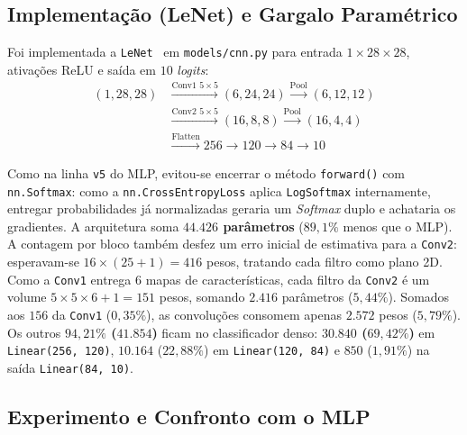 \documentclass[
	12pt,
	a4paper,
	article,
	twocolumn
]{abntex2}
\begin{document}
\subsection{Implementação (LeNet) e Gargalo Paramétrico}

Foi implementada a \texttt{LeNet}~\cite{lecun1998} em \texttt{models/cnn.py} para entrada $1 \times 28 \times 28$, ativações ReLU e saída em $10$ \textit{logits}:
{\small
\begin{equation*}
\begin{aligned}
(1,28,28) &\xrightarrow{\text{Conv1 }5\times 5} (6,24,24) \xrightarrow{\text{Pool}} (6,12,12) \\
&\xrightarrow{\text{Conv2 }5\times 5} (16,8,8) \xrightarrow{\text{Pool}} (16,4,4) \\
&\xrightarrow{\text{Flatten}} 256 \to 120 \to 84 \to 10
\end{aligned}
\end{equation*}
}

Como na linha \texttt{v5} do MLP, evitou-se encerrar o método \texttt{forward()} com \texttt{nn.Softmax}: como a \texttt{nn.CrossEntropyLoss} aplica \texttt{LogSoftmax} internamente, entregar probabilidades já normalizadas geraria um \textit{Softmax} duplo e achataria os gradientes. A arquitetura soma \textbf{$44.426$ parâmetros} ($89{,}1\%$ menos que o MLP). A contagem por bloco também desfez um erro inicial de estimativa para a \texttt{Conv2}: esperavam-se $16 \times (25 + 1) = 416$ pesos, tratando cada filtro como plano 2D. Como a \texttt{Conv1} entrega $6$ mapas de características, cada filtro da \texttt{Conv2} é um volume $5 \times 5 \times 6 + 1 = 151$ pesos, somando $2.416$ parâmetros ($5{,}44\%$). Somados aos $156$ da \texttt{Conv1} ($0{,}35\%$), as convoluções consomem apenas $2.572$ pesos ($5{,}79\%$). Os outros \textbf{$94{,}21\%$ ($41.854$)} ficam no classificador denso: \textbf{$30.840$ ($69{,}42\%$)} em \texttt{Linear(256, 120)}, $10.164$ ($22{,}88\%$) em \texttt{Linear(120, 84)} e $850$ ($1{,}91\%$) na saída \texttt{Linear(84, 10)}.

\subsection{Experimento e Confronto com o MLP}
\end{document}
